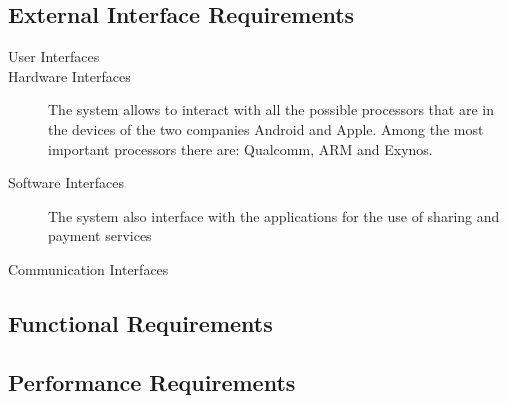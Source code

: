 \subsection{External Interface Requirements}
				\begin{description}
					\item[User Interfaces]
					\item[Hardware Interfaces] The system allows to interact with all the possible processors that are in the devices of the two companies Android and Apple. Among the most important processors there are: Qualcomm, ARM and Exynos.

					\item[Software Interfaces]			
						The system also interface with the applications for the use of sharing and payment services
						
					\item[Communication Interfaces]
				\end{description}

\subsection{Functional Requirements}
	
			
\subsection{Performance Requirements}
		
		
